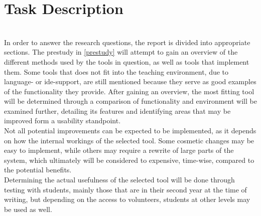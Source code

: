 \chapter{Task Description}\label{Task Description}%
~\\
In order to answer the research questions, the report is divided into appropriate sections.
The prestudy in \autoref{prestudy} will attempt to gain an overview of the different methods used by the tools in question, as well as tools that implement them.
Some tools that does not fit into the teaching environment, due to language- or \gls{ide}-support, are still mentioned because they serve as good examples of the functionality they provide.
After gaining an overview, the most fitting tool will be determined through a comparison of functionality and environment will be examined further, detailing its features and identifying areas that may be improved form a usability standpoint.
~\\

Not all potential improvements can be expected to be implemented, as it depends on how the internal workings of the selected tool.
Some cosmetic changes may be easy to implement, while others may require a rewrite of large parts of the system, which ultimately will be considered to expensive, time-wise, compared to the potential benefits.
~\\

Determining the actual usefulness of the selected tool will be done through testing with students, mainly those that are in their second year at the time of writing, but depending on the access to volunteers, students at other levels may be used as well.
~\\